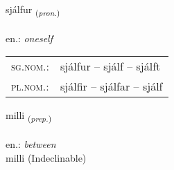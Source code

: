\documentclass[frontgrid, backgrid]{flacards}\usepackage[]{graphicx}\usepackage[]{xcolor}
\begin{document}
\renewcommand{\blhead}{\vskip5pt {\small\bfseries\footnotesize Fornafn | Pronoun }}
\renewcommand{\bcfoot}{\vskip5pt \hspace{2pt}{\small\bfseries\footnotesize 1K}}


{sjálfur \small{\textsubscript{(\textit{pron.})}} \\[1ex] %
\textphonetic{[sjaulvʏr]} \\
en.: \emph{oneself} \\  [2ex]
\renewcommand*{\arraystretch}{0.8}
\begin{tabular}{ll}
\textsc{sg.nom.}: & sjálfur  --  sjálf -- sjálft \\ 
\textsc{pl.nom.}: & sjálfir -- sjálfar -- sjálf
\end{tabular}
}


\renewcommand{\flhead}{\vskip5pt \fboxsep=0pt {\small\bfseries\footnotesize Forsetning | Preposition}}
\renewcommand{\fcfoot}{\vskip5pt \fboxsep=0pt \hspace{2pt}{\small\bfseries\footnotesize 1K}}

\renewcommand{\blhead}{\vskip5pt {\small\bfseries\footnotesize Forsetning | Preposition }}
\renewcommand{\bcfoot}{\vskip5pt \hspace{2pt}{\small\bfseries\footnotesize 1K}}


{milli \small{\textsubscript{(\textit{prep.})}} \\[1ex]
\textphonetic{[mɪtlɪ]} \\
en.: \emph{between} \\  [2ex]
milli (Indeclinable)}


\renewcommand{\flhead}{\vskip5pt \fboxsep=0pt {\small\bfseries\footnotesize Forsetning | Preposition}}
\renewcommand{\fcfoot}{\vskip5pt \fboxsep=0pt \hspace{2pt}{\small\bfseries\footnotesize 1K}}

\renewcommand{\blhead}{\vskip5pt {\small\bfseries\footnotesize Forsetning | Preposition }}
\renewcommand{\bcfoot}{\vskip5pt \hspace{2pt}{\small\bfseries\footnotesize 1K}}
\end{document}
